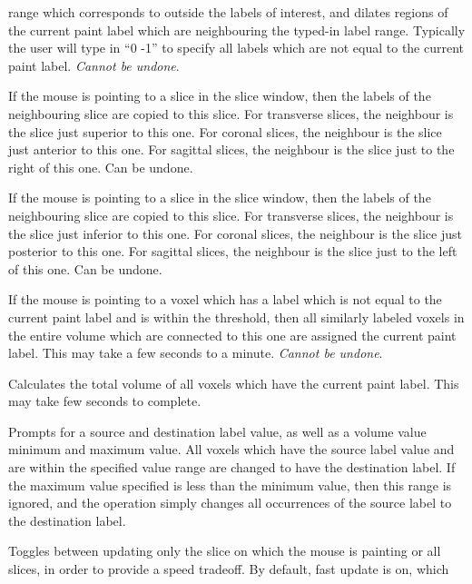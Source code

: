 \documentclass[11pt,letterpaper]{article}
\newcommand{\menutwo}[2]{{\scriptsize \fbox{\bf #1}/\fbox{\bf #2}}}
\begin{document}
\begin{description}
  range which corresponds to outside the labels of interest, and dilates
  regions of the current paint label which are neighbouring the typed-in
  label range. Typically the user will type in ``0 -1'' to specify all
  labels which are not equal to the current paint label. {\em Cannot be
    undone}.
\item[\menutwo{Segmenting}{Copy from Rt/Sup/Ant}] If the mouse is
  pointing to a slice in the slice window, then the labels of the
  neighbouring slice are copied to this slice.  For transverse slices,
  the neighbour is the slice just superior to this one.  For coronal
  slices, the neighbour is the slice just anterior to this one.  For
  sagittal slices, the neighbour is the slice just to the right of this
  one. Can be undone.
\item[\menutwo{Segmenting}{Copy from Lt/Inf/Pos}] If the mouse is
  pointing to a slice in the slice window, then the labels of the
  neighbouring slice are copied to this slice.  For transverse slices,
  the neighbour is the slice just inferior to this one.  For coronal
  slices, the neighbour is the slice just posterior to this one.  For
  sagittal slices, the neighbour is the slice just to the left of this
  one. Can be undone.
\item[\menutwo{Segmenting}{Fill 3D}] If the mouse is pointing to a voxel
  which has a label which is not equal to the current paint label and is
  within the threshold, then all similarly labeled voxels in the entire
  volume which are connected to this one are assigned the current paint
  label.  This may take a few seconds to a minute. {\em Cannot be undone}.
\item[\menutwo{Segmenting}{Calculate Volume}] Calculates the total
  volume of all voxels which have the current paint label. This may
  take few seconds to complete.
\item[\menutwo{Segmenting}{Change Labels}] Prompts for a source and
  destination label value, as well as a volume value minimum and maximum
  value.  All voxels which have the source label value and are within
  the specified value range are changed to have the destination label.
  If the maximum value specified is less than the minimum value, then
  this range is ignored, and the operation simply changes all
  occurrences of the source label to the destination label.
\item[\menutwo{Segmenting}{Fast Update}] Toggles between updating only
  the slice on which the mouse is painting or all slices, in order to
  provide a speed tradeoff.  By default, fast update is on, which

\end{description}
\end{document}
